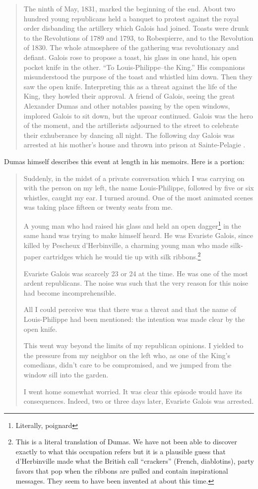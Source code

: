 \documentclass[12pt]{article}
\begin{document}
\begin{quote}
The ninth of May, 1831, marked the beginning of the end. About two hundred young republicans held a banquet to protest against the royal order disbanding the artillery which Galois had joined. Toasts were drunk to the Revolutions of 1789 and 1793, to Robespierre, and to the Revolution of 1830. The whole atmosphere of the gathering was revolutionary and defiant. Galois rose to propose a toast, his glass in one hand, his open pocket knife in the other. ``To Louis-Philippe--the King.'' His companions misunderstood the purpose of the toast and whistled him down. Then they saw the open knife. Interpreting this as a threat against the life of the King, they howled their approval. A friend of Galois, seeing the great Alexander Dumas and other notables passing by the open windows, implored Galois to sit down, but the uproar continued. Galois was the hero of the moment, and the artillerists adjourned to the street to celebrate their exhuberance by dancing all night. The following day Galois was arrested at his mother's house and thrown into prison at Sainte-Pelagie \cite{49}.
\end{quote}
Dumas himself describes this event at length in his memoirs. Here is a portion:

\begin{quotation}
Suddenly, in the midst of a private conversation which I was carrying on with the person on my left, the name Louis-Philippe, followed by five or six whistles, caught my ear. I turned around. One of the most animated scenes was taking place fifteen or twenty seats from me.

A young man who had raised his glass and held an open dagger\footnote{Literally, poignard} in the same hand was trying to make himself heard. He was Evariste Galois, since killed by Pescheux d'Herbinville, a charming young man who made silk-paper cartridges which he would tie up with silk ribbons.\footnote{This is a literal translation of Dumas. We have not been able to discover exactly to what this occupation refers but it is a plausible guess that d'Herbinville made what the British call ``crackers'' (French, diablotins), party favors that pop when the ribbons are pulled and contain inspirational messages. They seem to have been invented at about this time.}

Evariste Galois was scarcely 23 or 24 at the time. He was one of the most ardent republicans. The noise was such that the very reason for this noise had become incomprehensible. 

All I could perceive was that there was a threat and that the name of Louis-Philippe had been mentioned: the intention was made clear by the open knife. 

This went way beyond the limits of my republican opinions. I yielded to the pressure from my neighbor on the left who, as one of the King's comedians, didn't care to be compromised, and we jumped from the window sill into the garden. 

I went home somewhat worried. It was clear this episode would have its consequences. Indeed, two or three days later, Evariste Galois was arrested. \cite{50}
\end{quotation}
\end{document}
